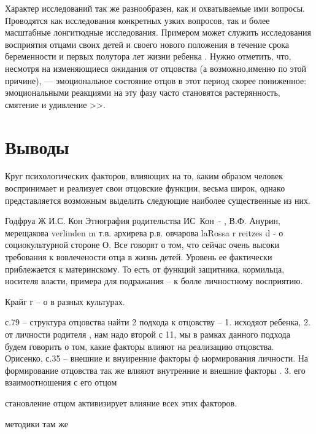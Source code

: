 \documentclass{../../common/thesisbyxetex}
\begin{document}
Характер исследований так же разнообразен, как и охватываемые ими вопросы. Проводятся как
исследования конкретных узких вопросов, так и более масштабные лонгитюдные исследования. Примером
может служить исследования восприятия отцами своих детей и своего нового положения в течение срока
беременности и первых полутора лет жизни ребенка \cite{percep}. Нужно отметить, что, несмотря на
изменяющиеся ожидания от отцовства (а возможно,именно по этой причине), --- эмоциональное состояние
отцов в этот период скорее пониженное: эмоциональными реакциями на эту фазу часто
становятся растерянность, смятение и удивление \cite[12]{meta}>>.

\chapter*{Выводы}

Круг психологических факторов, влияющих на то, каким
образом человек воспринимает и реализует свои отцовские функции, весьма широк, однако
представляется
возможным выделить следующие наиболее существенные из них.




Годфруа Ж 
И.С. Кон Этнография родительства
ИС Кон -
,
В.Ф. Анурин, мерещакова verlinden m
т.в. архирева
р.в. овчарова
laRossa r reitzes d  - о социокультурной стороне О.
Все говорят о том, что сейчас очень высоки требования к вовлечености отца в жизнь детей. Уровень ее 
фактически приблежается к материнскому. То есть от функций защитника, кормильца, носителя власти, 
примера для подражания – к болле личностному восприятию.

Крайг г – о в разных культурах.



с.79 – структура отцовства
найти
2 подхода к отцовству – 1. исходяот ребенка,
2. от личности родителя \cite[11]{psyot}, нам надо второй
с 11, мы в рамках данного подхода будем говорить о том, какие факторы влияют на реализацию 
отцовства.
Орисенко, с.35 – внешние и внуиренние факторы ф ыормирования личности. На формирование отцовства так 
же влияют внутренние и внешние факторы \cite[35]{psyot}.
3. его взаимоотношения с его отцом \cite[49]{rah}


становление отцом активизирует влияние всех этих факторов.

методики там же




\printbibliography[env=gostbibliography,sorting=ntvy]
\end{document}

